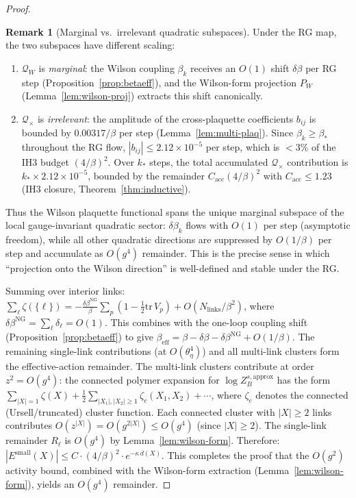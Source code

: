 \documentclass[11pt]{article}
\theoremstyle{definition}
\newtheorem{remark}[theorem]{Remark}
\newcommand{\tr}{\mathrm{tr}}
\begin{document}
\begin{proof}
\begin{remark}[Marginal vs.\ irrelevant quadratic
subspaces]\label{rem:marginal}
Under the RG map, the two subspaces have different scaling:
\begin{enumerate}[nosep,label=(\roman*)]
\item $\mathcal{Q}_W$ is \emph{marginal}: the Wilson coupling
$\beta_k$ receives an $O(1)$ shift $\delta\beta$ per RG step
(Proposition~\ref{prop:betaeff}), and the Wilson-form
projection $P_W$ (Lemma~\ref{lem:wilson-proj}) extracts this
shift canonically.
\item $\mathcal{Q}_\times$ is \emph{irrelevant}: the amplitude
of the cross-plaquette coefficients $b_{ij}$ is bounded by
$0.00317/\beta$ per step (Lemma~\ref{lem:multi-plaq}).
Since $\beta_k\ge\beta_*$ throughout the RG flow,
$|b_{ij}|\le 2.12\times 10^{-5}$ per step, which is $<3\%$
of the IH3 budget $(4/\beta)^2$.  Over $k_*$ steps, the total
accumulated $\mathcal{Q}_\times$ contribution is
$k_*\times 2.12\times 10^{-5}$, bounded by the remainder
$C_{\mathrm{acc}}(4/\beta)^2$ with $C_{\mathrm{acc}}\le 1.23$
(IH3 closure, Theorem~\ref{thm:inductive}).
\end{enumerate}
Thus the Wilson plaquette functional spans the unique marginal
subspace of the local gauge-invariant quadratic sector:
$\delta\beta_k$ flows with $O(1)$ per step (asymptotic freedom),
while all other quadratic directions are suppressed by
$O(1/\beta)$ per step and accumulate as $O(g^4)$ remainder.
This is the precise sense in which ``projection onto the
Wilson direction'' is well-defined and stable under the RG.
\end{remark}

Summing over interior links:
$\sum_\ell\zeta(\{\ell\})
=-\frac{\delta\beta^{\mathrm{NG}}}{\beta}\sum_p
(1-\frac{1}{2}\tr\,V_p)+O(N_{\mathrm{links}}/\beta^2)$,
where $\delta\beta^{\mathrm{NG}}=\sum_\ell\delta_\ell=O(1)$.
This combines with the one-loop coupling shift
(Proposition~\ref{prop:betaeff}) to give
$\beta_{\mathrm{eff}}=\beta-\delta\beta-\delta\beta^{\mathrm{NG}}
+O(1/\beta)$.
The remaining single-link contributions (at $O(\theta_\eta^4)$)
and all multi-link clusters form the
effective-action remainder.  The multi-link clusters contribute
at order $z^2=O(g^4)$: the connected polymer expansion for
$\log Z_B^{s,\mathrm{approx}}$ has the form
$\sum_{|X|=1}\zeta(X)+\frac{1}{2}\sum_{|X_1|,|X_2|\ge 1}
\zeta_c(X_1,X_2)+\cdots$, where $\zeta_c$ denotes the
connected (Ursell/truncated) cluster function.  Each connected
cluster with $|X|\ge 2$ links contributes $O(z^{|X|})
=O(g^{2|X|})\le O(g^4)$ (since $|X|\ge 2$).  The single-link
remainder $R_\ell$ is $O(g^4)$ by Lemma~\ref{lem:wilson-form}.
Therefore:
$|E^{\mathrm{small}}(X)|\le C\cdot(4/\beta)^2
\cdot e^{-\kappa\,d(X)}$.
This completes the proof that the $O(g^2)$ activity bound,
combined with the Wilson-form extraction
(Lemma~\ref{lem:wilson-form}), yields an $O(g^4)$ remainder.
\end{proof}
\end{document}
